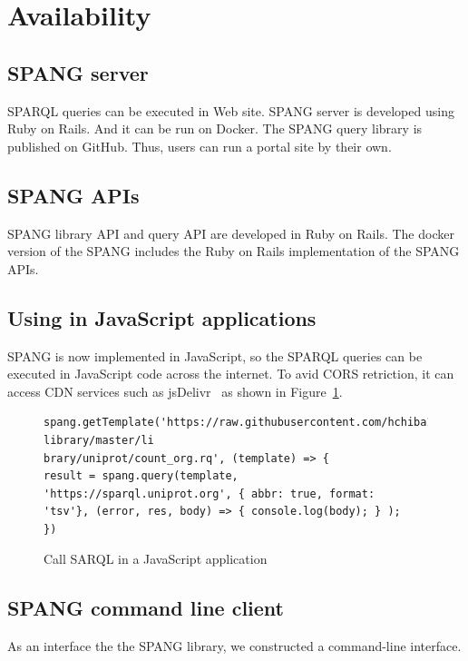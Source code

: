 \documentclass[runningheads]{llncs}
\begin{document}
\section{Availability}

\subsection{SPANG server}
SPARQL queries can be executed in Web site.
SPANG server is developed using Ruby on Rails. And it can be run on Docker. The SPANG query library is published on GitHub. Thus, users can run a portal site by their own.

\subsection{SPANG APIs}
SPANG library API and query API are developed in Ruby on Rails. The docker version of the SPANG includes the Ruby on Rails implementation of the SPANG APIs.


\subsection{Using in JavaScript applications}
SPANG is now implemented in JavaScript, so the SPARQL queries can be executed in JavaScript code across the internet. To avid CORS retriction, it can access CDN services such as jsDelivr~\cite{jsdelivr} as shown in Figure~\ref{fig:jsdelivr}.



\begin{figure}[!t]
\begin{scriptsize}
\begin{verbatim}
spang.getTemplate('https://raw.githubusercontent.com/hchiba1/spang-library/master/li
brary/uniprot/count_org.rq', (template) => {
result = spang.query(template, 'https://sparql.uniprot.org', { abbr: true, format:
'tsv'}, (error, res, body) => { console.log(body); } );
})
\end{verbatim}
\end{scriptsize}
\caption{Call SARQL in a JavaScript application}
\label{fig:jsdelivr}
\end{figure}


\subsection{SPANG command line client}
As an interface the the SPANG library, we constructed a command-line interface.
\end{document}
